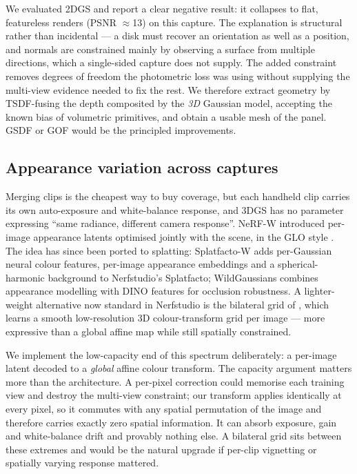 We evaluated 2DGS and report a clear negative result: it collapses to flat,
featureless renders (PSNR $\approx$13) on this capture. The explanation is
structural rather than incidental — a disk must recover an orientation as well as a
position, and normals are constrained mainly by observing a surface from multiple
directions, which a single-sided capture does not supply. The added constraint
removes degrees of freedom the photometric loss was using without supplying the
multi-view evidence needed to fix the rest. We therefore extract geometry by
TSDF-fusing \cite{curless1996tsdf} the depth composited by the \emph{3D} Gaussian
model, accepting the known bias of volumetric primitives, and obtain a usable mesh
of the panel. GSDF or GOF would be the principled improvements.

\subsection{Appearance variation across captures}

Merging clips is the cheapest way to buy coverage, but each handheld clip carries
its own auto-exposure and white-balance response, and 3DGS has no parameter
expressing ``same radiance, different camera response''. NeRF-W
\cite{martinbrualla2021nerfw} introduced per-image appearance latents optimised
jointly with the scene, in the GLO style \cite{bojanowski2018glo}. The idea has
since been ported to splatting: Splatfacto-W \cite{xu2024splatfactow} adds
per-Gaussian neural colour features, per-image appearance embeddings and a
spherical-harmonic background to Nerfstudio's Splatfacto; WildGaussians
\cite{kulhanek2024wildgaussians} combines appearance modelling with DINO features
for occlusion robustness. A lighter-weight alternative now standard in Nerfstudio
is the bilateral grid of \citet{wang2024bilateral}, which learns a smooth
low-resolution 3D colour-transform grid per image — more expressive than a global
affine map while still spatially constrained.

We implement the low-capacity end of this spectrum deliberately: a per-image latent
decoded to a \emph{global} affine colour transform. The capacity argument matters
more than the architecture. A per-pixel correction could memorise each training
view and destroy the multi-view constraint; our transform applies identically at
every pixel, so it commutes with any spatial permutation of the image and therefore
carries exactly zero spatial information. It can absorb exposure, gain and
white-balance drift and provably nothing else. A bilateral grid sits between these
extremes and would be the natural upgrade if per-clip vignetting or spatially
varying response mattered.

